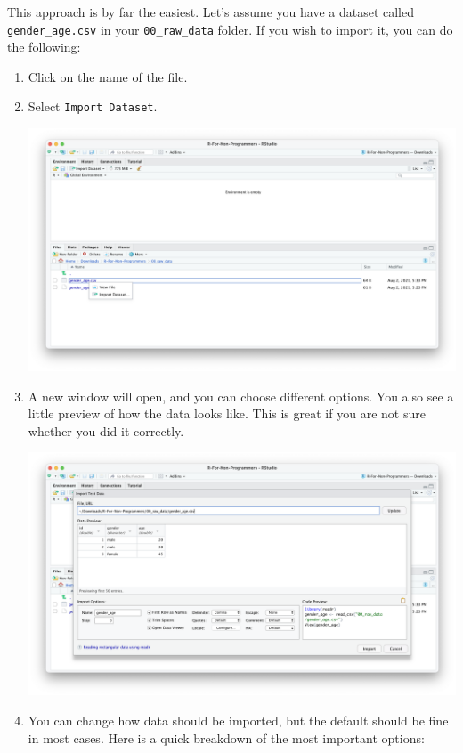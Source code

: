 \documentclass[
  letterpaper,
]{krantz}
\begin{document}
This approach is by far the easiest. Let's assume you have a dataset
called \texttt{gender\_age.csv} in your \texttt{00\_raw\_data} folder.
If you wish to import it, you can do the following:

\begin{enumerate}
\def\labelenumi{\arabic{enumi}.}
\item
  Click on the name of the file.
\item
  Select \texttt{Import\ Dataset}.

  \includegraphics{images/chapter_07_img/01_files_pane_import/01_files_pane_import.png}
\item
  A new window will open, and you can choose different options. You also
  see a little preview of how the data looks like. This is great if you
  are not sure whether you did it correctly.

  \includegraphics{images/chapter_07_img/01_files_pane_import/02_files_pane_import.png}
\item
  You can change how data should be imported, but the default should be
  fine in most cases. Here is a quick breakdown of the most important
  options:


\end{enumerate}
\end{document}
